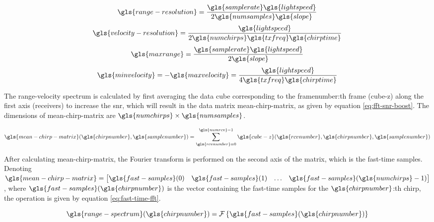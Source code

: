 \begin{equation}
    \label{eq:2dfft-range-resolution}
    \gls{range-resolution} = \frac{\gls{samplerate} \gls{lightspeed}}{2\gls{numsamples}\gls{slope}}
\end{equation}
\begin{equation}
    \label{eq:2dfft-velocity-resolution}
    \gls{velocity-resolution} = \frac{\gls{lightspeed}}{2 \gls{numchirps} \gls{txfreq} \gls{chirptime}}
\end{equation}
\begin{equation}
    \label{eq:2dfft-max-range}
    \gls{maxrange} = \frac{\gls{samplerate} \gls{lightspeed}}{2 \gls{slope}}
\end{equation}
\begin{equation}
    \label{eq:2dfft-min-max-velocity}
    \gls{minvelocity} = -\gls{maxvelocity} = \frac{\gls{lightspeed}}{4 \gls{txfreq} \gls{chirptime}} \\
\end{equation}

The range-velocity spectrum is calculated by first averaging the data
cube corresponding to the \gls{framenumber}:th frame (\gls{cube-z})
along the first axis (receivers) to increase the \gls{snr},
which will result in the data matrix \gls{mean-chirp-matrix}, as given by equation \ref{eq:fft-snr-boost}.
The dimensions of \gls{mean-chirp-matrix} are $\gls{numchirps} \times \gls{numsamples}$.

\begin{equation}
    \label{eq:fft-snr-boost}
    \gls{mean-chirp-matrix}(\gls{chirpnumber}, \gls{samplenumber}) = \sum \limits_{\gls{rcvnumber} = 0}^{\gls{numrcv}-1} \gls{cube-z}(\gls{rcvnumber}, \gls{chirpnumber}, \gls{samplenumber})
\end{equation}

After calculating \gls{mean-chirp-matrix}, the Fourier transform is performed on the second axis of the matrix,
which is the fast-time samples. Denoting $\gls{mean-chirp-matrix} = \begin{bmatrix} \gls{fast-samples}(0) & \gls{fast-samples}(1) & \ldots & \gls{fast-samples}(\gls{numchirps}-1) \end{bmatrix}$,
where $\gls{fast-samples}(\gls{chirpnumber})$ is the vector containing the fast-time samples for the $\gls{chirpnumber}$:th chirp,
the operation is given by equation \ref{eq:fast-time-fft}.

\begin{equation}
    \label{eq:fast-time-fft}
    \gls{range-spectrum}(\gls{chirpnumber}) = \mathcal{F} \left\{ \gls{fast-samples}(\gls{chirpnumber}) \right\}
\end{equation}

